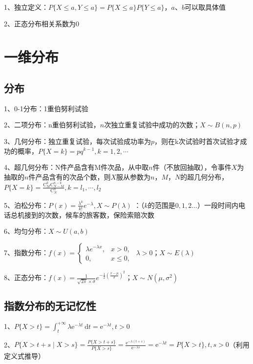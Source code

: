 1、独立定义：$ P\{X \le a, Y \le a\} = P\{X \le a\}P\{Y \le a\} $，$ a $、$ b $可以取具体值

2、正态分布相关系数为0

\section{一维分布}



\subsection{分布}

1、0-1分布：1重伯努利试验

2、二项分布：n重伯努利试验，$ n $次独立重复试验中成功的次数；$ X \sim B(n,p) $

3、几何分布：独立重复试验，每次试验成功率为$ p $，则在k次试验时首次试验才成功的概率，$ P\{X=k\}=p q^{k-1}, k=1,2, \cdots $

4、超几何分布：N件产品含有M件次品，从中取$ n $件（不放回抽取），令事件$ X $为抽取的$ n $件产品含有的次品个数，则$ X $服从参数为$ n $，$ M $，$ N $的超几何分布，$ P\{X=k\}=\frac{\mathrm{C}_{M}^{k} \mathrm{C}_{N-M}^{n-k}}{\mathrm{C}_{N}^{n}}, k=l_{1}, \cdots, l_{2} $

5、泊松分布：$ P(x) = \frac{\lambda^k}{k!}e^{-\lambda},X \sim P(\lambda) $ ：（$ k $的范围是$ 0,1,2... $）一段时间内电话总机接到的次数，候车的旅客数，保险索赔次数

6、均匀分布：$ X \sim U(a,b) $

7、指数分布：$ f(x) = \begin{cases} \lambda e^{-\lambda x}, & x > 0, \\[5ex] 0, & x \le 0, \end{cases} \ \ \lambda >0 $；$ X \sim E(\lambda) $

8、正态分布：$ f(x)=\frac{1}{\sqrt{{2\pi}}\times\sigma}e^{-\frac{1}{2}(\frac{x-\mu}{\sigma})^2} $；$ X \sim N(\mu,\sigma^2) $



\subsection{指数分布的无记忆性}

1、$ P\{X>t\}=\int_{t}^{+\infty} \lambda \mathrm{e}^{-\lambda t} \mathrm{~d} t=\mathrm{e}^{-\lambda t}, t>0 $

2、$ P\{X>t+s \mid X>s\}=\frac{P\{X>t+s\}}{P\{X>s\}}=\frac{\mathrm{e}^{-\lambda(t+s)}}{\mathrm{e}^{-\lambda s}}=\mathrm{e}^{-\lambda t}=P\{X>t\}, t, s>0 $（利用定义式推导）

